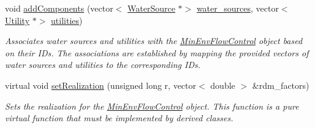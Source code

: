 \begin{DoxyCompactItemize}
void \mbox{\hyperlink{classMinEnvFlowControl_a4f849e1385f68c9d8f2835889f14a71f}{add\+Components}} (vector$<$ \mbox{\hyperlink{classWaterSource}{Water\+Source}} $\ast$$>$ \mbox{\hyperlink{classMinEnvFlowControl_a36b50d0e6887b956051ae53bf5d2e3a9}{water\+\_\+sources}}, vector$<$ \mbox{\hyperlink{classUtility}{Utility}} $\ast$$>$ \mbox{\hyperlink{classMinEnvFlowControl_a1a0a309138b35e8199c205efb5fb5f80}{utilities}})
\begin{DoxyCompactList}\small\item\em Associates water sources and utilities with the {\ttfamily \mbox{\hyperlink{classMinEnvFlowControl}{Min\+Env\+Flow\+Control}}} object based on their I\+Ds. The associations are established by mapping the provided vectors of water sources and utilities to the corresponding I\+Ds. \end{DoxyCompactList}\item 
virtual void \mbox{\hyperlink{classMinEnvFlowControl_a630550c31f5c4e1a368289cbd5ab98ee}{set\+Realization}} (unsigned long r, vector$<$ double $>$ \&rdm\+\_\+factors)
\begin{DoxyCompactList}\small\item\em Sets the realization for the {\ttfamily \mbox{\hyperlink{classMinEnvFlowControl}{Min\+Env\+Flow\+Control}}} object. This function is a pure virtual function that must be implemented by derived classes. \end{DoxyCompactList}\end{DoxyCompactItemize}

